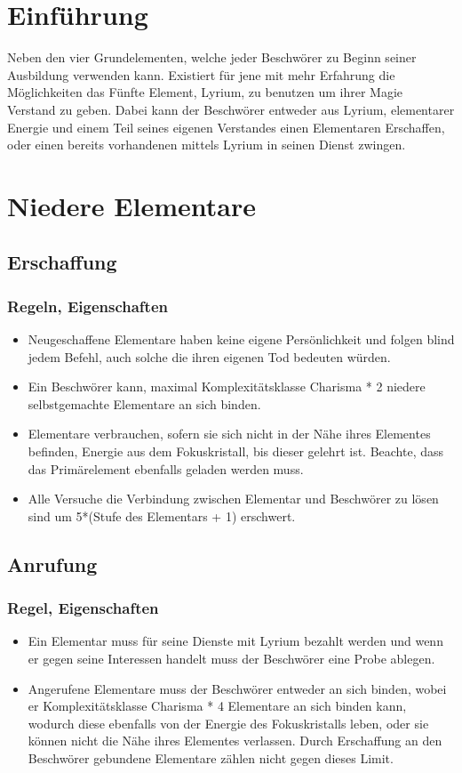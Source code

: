 \documentclass[a4paper,12pt,oneside]{book}
\begin{document}
\chapter{Einführung}
Neben den vier Grundelementen, welche jeder Beschwörer zu Beginn seiner Ausbildung verwenden kann. Existiert für jene mit mehr Erfahrung die Möglichkeiten das Fünfte Element, Lyrium, zu benutzen um ihrer Magie Verstand zu geben. Dabei kann der Beschwörer entweder aus Lyrium, elementarer Energie und einem Teil seines eigenen Verstandes einen Elementaren Erschaffen, oder einen bereits vorhandenen mittels Lyrium in seinen Dienst zwingen.

\chapter{Niedere Elementare}
\section{Erschaffung}
\subsection{Regeln, Eigenschaften}
\begin{itemize}
\item Neugeschaffene Elementare haben keine eigene Persönlichkeit und folgen blind jedem Befehl, auch solche die ihren eigenen Tod bedeuten würden.
\item Ein Beschwörer kann, maximal Komplexitätsklasse Charisma * 2 niedere selbstgemachte Elementare an sich binden.
\item Elementare verbrauchen, sofern sie sich nicht in der Nähe ihres Elementes befinden, Energie aus dem Fokuskristall, bis dieser gelehrt ist. Beachte, dass das Primärelement ebenfalls geladen werden muss.
\item Alle Versuche die Verbindung zwischen Elementar und Beschwörer zu lösen sind um 5*(Stufe des Elementars + 1) erschwert. 
\end{itemize}
\section{Anrufung}
\subsection{Regel, Eigenschaften}
\begin{itemize}
\item Ein Elementar muss für seine Dienste mit Lyrium bezahlt werden und wenn er gegen seine Interessen handelt muss der Beschwörer eine Probe ablegen.
\item Angerufene Elementare muss der Beschwörer entweder an sich binden, wobei er Komplexitätsklasse Charisma * 4 Elementare an sich binden kann, wodurch diese ebenfalls von der Energie des Fokuskristalls leben, oder sie können nicht die Nähe ihres Elementes verlassen. Durch Erschaffung an den Beschwörer gebundene Elementare zählen nicht gegen dieses Limit. 
\end{itemize}
\end{document}
